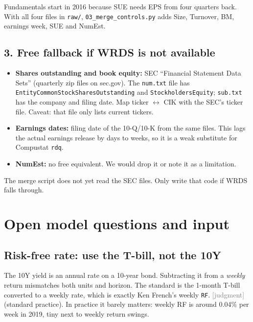\documentclass[11pt]{article}
\newcommand{\judg}{\textcolor{Gray}{\textsf{[judgment]}}}
\newcommand{\var}[1]{\texttt{#1}}
\begin{document}
Fundamentals start in 2016 because SUE needs EPS from four quarters back. With all four files in \var{raw/}, \var{03\_merge\_controls.py} adds Size, Turnover, BM, earnings week, SUE and NumEst.

\subsection*{3. Free fallback if WRDS is not available}
\begin{itemize}
  \item \textbf{Shares outstanding and book equity:} SEC ``Financial Statement Data Sets'' (quarterly zip files on sec.gov). The \var{num.txt} file has \var{EntityCommonStockSharesOutstanding} and \var{StockholdersEquity}; \var{sub.txt} has the company and filing date. Map ticker $\leftrightarrow$ CIK with the SEC's ticker file. Caveat: that file only lists current tickers.
  \item \textbf{Earnings dates:} filing date of the 10-Q/10-K from the same files. This lags the actual earnings release by days to weeks, so it is a weak substitute for Compustat \var{rdq}.
  \item \textbf{NumEst:} no free equivalent. We would drop it or note it as a limitation.
\end{itemize}
The merge script does not yet read the SEC files. Only write that code if WRDS falls through.

\section{Open model questions and input}\label{sec:issues}

\subsection{Risk-free rate: use the T-bill, not the 10Y}
The 10Y yield is an annual rate on a 10-year bond. Subtracting it from a \emph{weekly} return mismatches both units and horizon. The standard is the 1-month T-bill converted to a weekly rate, which is exactly Ken French's weekly \var{RF}. \judg{} (standard practice). In practice it barely matters: weekly RF is around 0.04\% per week in 2019, tiny next to weekly return swings.
\end{document}
